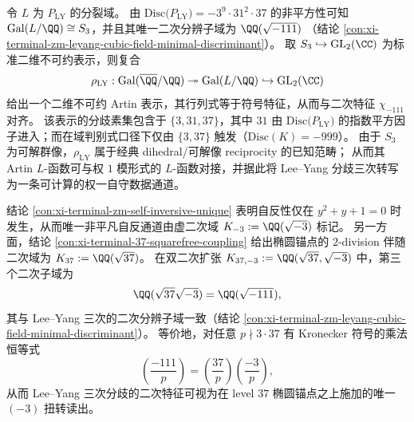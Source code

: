 \begin{remark}[二次分辨子域的规范特征与权一自守对接]\label{rem:xi-terminal-zm-leyang-artin-weight1-interface}
令 \(L\) 为 \(P_{\mathrm{LY}}\) 的分裂域。
由 \(\mathrm{Disc}\bigl(P_{\mathrm{LY}}\bigr)=-3^{9}\cdot 31^{2}\cdot 37\) 的非平方性可知 \(\mathrm{Gal}(L/\QQ)\cong S_3\)，并且其唯一二次分辨子域为
\(
\QQ(\sqrt{-111})
\)
（结论 \ref{con:xi-terminal-zm-leyang-cubic-field-minimal-discriminant}）。
取 \(S_3\hookrightarrow \mathrm{GL}_2(\CC)\) 为标准二维不可约表示，则复合
\[
\rho_{\mathrm{LY}}:\mathrm{Gal}(\overline{\QQ}/\QQ)\twoheadrightarrow \mathrm{Gal}(L/\QQ)\hookrightarrow \mathrm{GL}_2(\CC)
\]
给出一个二维不可约 Artin 表示，其行列式等于符号特征，从而与二次特征 \(\chi_{-111}\) 对齐。
该表示的分歧素集包含于 \(\{3,31,37\}\)，其中 \(31\) 由 \(\mathrm{Disc}\bigl(P_{\mathrm{LY}}\bigr)\) 的指数平方因子进入；而在域判别式口径下仅由 \(\{3,37\}\) 触发（\(\mathrm{Disc}(K)=-999\)）。
由于 \(S_3\) 为可解群像，\(\rho_{\mathrm{LY}}\) 属于经典 dihedral/可解像 reciprocity 的已知范畴；
从而其 Artin \(L\)-函数可与权 \(1\) 模形式的 \(L\)-函数对接，并据此将 Lee--Yang 分歧三次转写为一条可计算的权一自守数据通道。\cite{DeligneSerre1974WeightOne}
\end{remark}

\begin{remark}\label{rem:xi-terminal-zm-leyang-sqrtminus111-twist}
结论 \ref{con:xi-terminal-zm-self-inversive-unique} 表明自反性仅在 \(y^2+y+1=0\) 时发生，从而唯一非平凡自反通道由虚二次域
\(
K_{-3}:=\QQ(\sqrt{-3})
\)
标记。
另一方面，结论 \ref{con:xi-terminal-37-squarefree-coupling} 给出椭圆锚点的 \(2\)-division 伴随二次域为
\(
K_{37}:=\QQ(\sqrt{37})
\)。
在双二次扩张 \(K_{37,-3}:=\QQ(\sqrt{37},\sqrt{-3})\) 中，第三个二次子域为
\[
\QQ(\sqrt{37}\sqrt{-3})=\QQ(\sqrt{-111}),
\]
其与 Lee--Yang 三次的二次分辨子域一致（结论 \ref{con:xi-terminal-zm-leyang-cubic-field-minimal-discriminant}）。
等价地，对任意 \(p\nmid 3\cdot 37\) 有 Kronecker 符号的乘法恒等式
\[
\left(\frac{-111}{p}\right)=\left(\frac{37}{p}\right)\left(\frac{-3}{p}\right),
\]
从而 Lee--Yang 三次分歧的二次特征可视为在 level \(37\) 椭圆锚点之上施加的唯一 \((-3)\) 扭转读出。
\end{remark}

